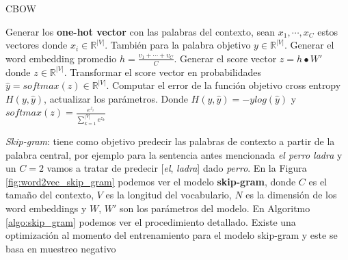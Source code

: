 \begin{algorithm}
\caption{CBOW}
\begin{algorithmic}[1]
\label{algo:cbow}
\STATE Generar los \textbf{one-hot vector} con las palabras del contexto, sean $x_{1}, \cdots , x_{C}$ estos vectores donde $x_{i} \in \mathbb{R}^{|V|}$. También para la palabra objetivo $y \in \mathbb{R}^{|V|}$.
\STATE Generar el word embedding promedio $h = \frac{v_{1} + \cdots + v_{C}}{C}$.
\STATE Generar el score vector $z = h \bullet W'$ donde $z \in \mathbb{R}^{|V|}$.
\STATE Transformar el score vector en probabilidades $\hat{y} = softmax(z) \in \mathbb{R}^{|V|}$.
\STATE Computar el error de la función objetivo cross entropy $H(y, \hat{y})$, actualizar los parámetros. Donde $H(y, \hat{y}) = −y log(\hat{y})$ y $softmax(z) = \frac{e^{z_{i}}}{\sum_{k = 1}^{|V|} e^{z_{k}}}$
\end{algorithmic}
\end{algorithm}

\textit{Skip-gram}: tiene como objetivo predecir las palabras de contexto a partir de la palabra central, por ejemplo para la sentencia antes mencionada \textit{el perro ladra} y un $C = 2$ vamos a tratar de predecir [\textit{el}, \textit{ladra}] dado \textit{perro}. En la Figura \ref{fig:word2vec_skip_gram} podemos ver el modelo \textbf{skip-gram}, donde $C$ es el tamaño del contexto, $V$ es la longitud del vocabulario, $N$ es la dimensión de los word embeddings y $W$, $W'$ son los parámetros del modelo. En Algoritmo \ref{algo:skip_gram} podemos ver el procedimiento detallado. Existe una optimización al momento del entrenamiento para el modelo skip-gram y este se basa en muestreo negativo \cite{MikolovSCCD13}

